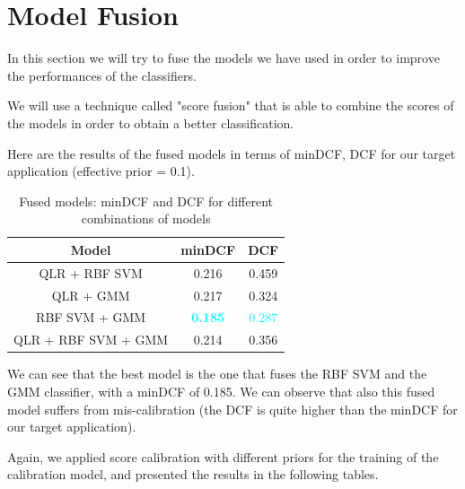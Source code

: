 \documentclass[12pt]{report}
\newcommand{\nnl}{%
    \newline
    \newline
}
\newcommand{\nl}{%
    \newline
    \noindent
}
\begin{document}
\section{Model Fusion}
In this section we will try to fuse the models we have used in order to improve the performances of the classifiers.
\nl
We will use a technique called "score fusion" that is able to combine the scores of the models in order to obtain a better classification.
\nnl
Here are the results of the fused models in terms of minDCF, DCF for our target application (effective prior = 0.1).
\begin{table}[H]
    \centering
    \begin{tabular}{|c|c|c|}
        \hline
        \rowcolor{blue!10}
        \textbf{Model}      & \textbf{minDCF}                  & \textbf{DCF}            \\
        \hline
        QLR + RBF SVM       & 0.216                            & 0.459                   \\
        \hline
        QLR + GMM           & 0.217                            & 0.324                   \\
        \hline
        RBF SVM + GMM       & \textcolor{cyan}{\textbf{0.185}} & \textcolor{cyan}{0.287} \\
        \hline
        QLR + RBF SVM + GMM & 0.214                            & 0.356                   \\
        \hline
    \end{tabular}
    \caption{Fused models: minDCF and DCF for different combinations of models}
    \label{tab:Fused_Models}
\end{table}
\noindent
We can see that the best model is the one that fuses the RBF SVM and the GMM classifier, with a minDCF of 0.185. We can observe that also this fused model suffers from mis-calibration (the DCF is quite higher than the minDCF for our target application).
\nnl
Again, we applied score calibration with different priors for the training of the calibration model, and presented the results in the following tables.
\end{document}
